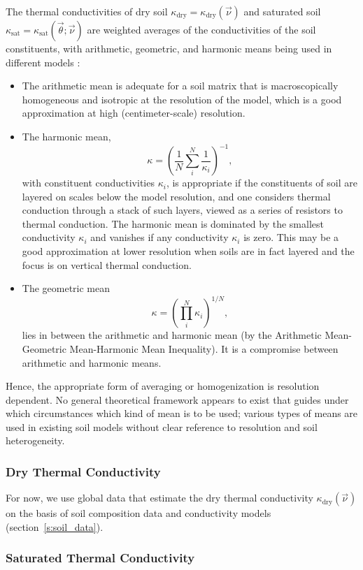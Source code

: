 \documentclass[twoside,10pt]{report}
\begin{document}
The thermal conductivities of dry soil $\kappa_{\mathrm{dry}} = \kappa_{\mathrm{dry}}(\vec{\nu})$ and saturated soil $\kappa_{\mathrm{sat}} = \kappa_{\mathrm{sat}}(\vec{\theta}; \vec{\nu})$ are weighted averages of the conductivities of the soil constituents, with arithmetic, geometric, and harmonic means being used in different models \citep{Dai19a}: 
\begin{itemize}
    \item The arithmetic mean is adequate for a soil matrix that is macroscopically homogeneous and isotropic at the resolution of the model, which is a good approximation at high (centimeter-scale) resolution. 
    \item The harmonic mean,
    \[
    \kappa = \left( \frac{1}{N} \sum_i^N \frac{1}{\kappa_i} \right)^{-1},
    \]
    with constituent conductivities $\kappa_i$, is appropriate if the constituents of soil are layered on scales below the model resolution, and one considers thermal conduction through a stack of such layers, viewed as a series of resistors to thermal conduction. The harmonic mean is dominated by the smallest conductivity $\kappa_i$ and vanishes if any conductivity $\kappa_i$ is zero. This may be a good approximation at lower resolution when soils are in fact layered and the focus is on vertical thermal conduction. 
    \item The geometric mean 
    \[
    \kappa = \left( \prod_i^N \kappa_i \right)^{1/N},
    \]
    lies in between the arithmetic and harmonic mean (by the Arithmetic Mean-Geometric Mean-Harmonic Mean Inequality). It is a compromise between arithmetic and harmonic means. 
\end{itemize}
Hence, the appropriate form of averaging or homogenization is resolution dependent. No general theoretical framework appears to exist that guides under which circumstances which kind of mean is to be used; various types of means are used in existing soil models without clear reference to resolution and soil heterogeneity. 

\subsubsection{Dry Thermal Conductivity}

For now, we use global data that estimate the dry thermal conductivity $\kappa_{\mathrm{dry}}(\vec{\nu})$ on the basis of soil composition data and conductivity models \citep{Dai19a} (section~\ref{s:soil_data}). 

\subsubsection{Saturated Thermal Conductivity}
\end{document}
